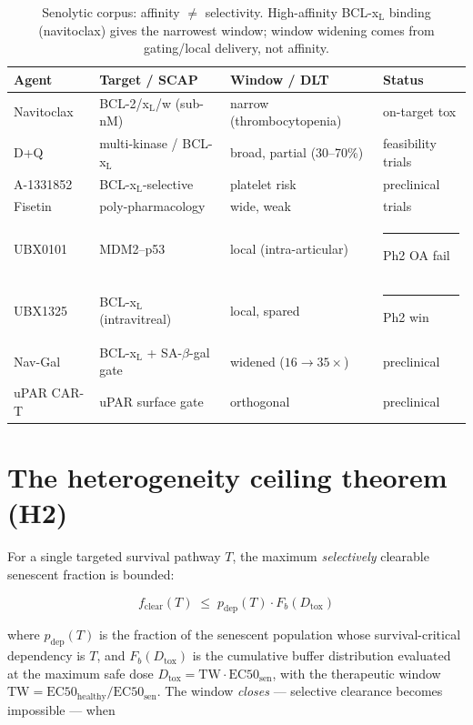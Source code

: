 \documentclass[11pt,a4paper]{article}
\newcommand{\tierdisc}[1]{\textcolor{#1}{\rule[0.05ex]{1.0ex}{1.0ex}}}
\newcommand{\tierGreen}{\tierdisc{green!60!black}}
\newcommand{\tierRed}{\tierdisc{red!80!black}}
\newcommand{\fclear}{f_{\mathrm{clear}}}
\newcommand{\pdep}{p_{\mathrm{dep}}}
\begin{document}
\begin{table}[t]
\centering
\caption{Senolytic corpus: affinity $\neq$ selectivity. High-affinity
BCL-x$_{\mathrm L}$ binding (navitoclax) gives the narrowest window; window
widening comes from gating/local delivery, not affinity.}
\label{tab:corpus}
\small
\begin{tabular}{@{}llll@{}}
\toprule
Agent & Target / SCAP & Window / DLT & Status \\
\midrule
Navitoclax \citep{chang2016} & BCL-2/x$_{\mathrm L}$/w (sub-nM) & narrow (thrombocytopenia) & on-target tox \\
D+Q \citep{zhu2015} & multi-kinase / BCL-x$_{\mathrm L}$ & broad, partial (30--70\%) & feasibility trials \\
A-1331852 & BCL-x$_{\mathrm L}$-selective & platelet risk & preclinical \\
Fisetin \citep{yousefzadeh2018} & poly-pharmacology & wide, weak & trials \\
UBX0101 \citep{jeon2017} & MDM2--p53 & local (intra-articular) & \tierRed{} Ph2 OA fail \\
UBX1325 \citep{ubx1325} & BCL-x$_{\mathrm L}$ (intravitreal) & local, spared & \tierGreen{} Ph2 win \\
Nav-Gal \citep{navgal2020} & BCL-x$_{\mathrm L}$ + SA-$\beta$-gal gate & widened ($16\!\to\!35\times$) & preclinical \\
uPAR CAR-T \citep{amor2020} & uPAR surface gate & orthogonal & preclinical \\
\bottomrule
\end{tabular}
\end{table}

\section{The heterogeneity ceiling theorem (H2)}
\label{sec:ceiling}

For a single targeted survival pathway $T$, the maximum \emph{selectively}
clearable senescent fraction is bounded:

\begin{equation}
\boxed{\;\fclear(T) \;\le\; \pdep(T)\cdot F_b(D_{\mathrm{tox}})\;}
\label{eq:ceiling}
\end{equation}

where $\pdep(T)$ is the fraction of the senescent population whose
survival-critical dependency is $T$, and $F_b(D_{\mathrm{tox}})$ is the
cumulative buffer distribution evaluated at the maximum safe dose
$D_{\mathrm{tox}}=\mathrm{TW}\cdot\mathrm{EC50}_{\mathrm{sen}}$, with the
therapeutic window $\mathrm{TW}=\mathrm{EC50}_{\mathrm{healthy}}/\mathrm{EC50}_{\mathrm{sen}}$.
The window \emph{closes} --- selective clearance becomes impossible --- when
\end{document}
